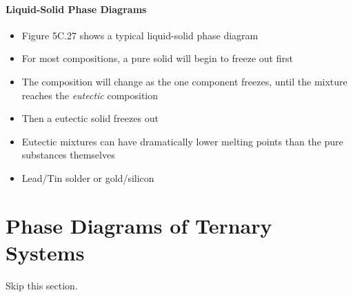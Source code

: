 \documentclass[12pt, openany, letterpaper]{memoir}
\begin{document}
\paragraph{Liquid-Solid Phase Diagrams}
\begin{itemize}
	\item Figure 5C.27 shows a typical liquid-solid phase diagram
	\item For most compositions, a pure solid will begin to freeze out first
	\item The composition will change as the one component freezes, until the mixture reaches the \emph{eutectic} composition
	\item Then a eutectic solid freezes out
	\item Eutectic mixtures can have dramatically lower melting points than the pure substances themselves
	\item Lead/Tin solder or gold/silicon
\end{itemize}
\section{Phase Diagrams of Ternary Systems}
Skip this section.
\end{document}
